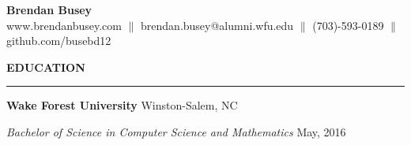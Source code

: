\documentclass[executivepaper]{extarticle}
\begin{document}
\begin{center}

\thispagestyle{empty}

\resizebox{!}{4.3in}
{
\begin{minipage}{7.0in}


\begin{center}

\LARGE\textbf{\fontsize{14}{12}\selectfont Brendan Busey} \\

\fontsize {10}{8}\selectfont {\faDesktop} www.brendanbusey.com $\parallel$ \fontsize{10}{8}\selectfont {\faEnvelope} brendan.busey@alumni.wfu.edu $\parallel$ \fontsize{10}{8}\selectfont {\faPhone} (703)-593-0189 $\parallel$ \fontsize{10}{8}\selectfont {\faGithub} github.com/busebd12

\end{center}


\vspace{-1mm}

{\noindent \textbf{\fontsize{12}{9}\selectfont EDUCATION}}

\vspace{-3mm}

\noindent \rule{\textwidth}{0.5pt}

\vspace{0.5mm}

{\noindent \textbf{\fontsize{11}{8}\selectfont Wake Forest University}} {\hfill \fontsize{10}{7}\selectfont Winston-Salem, NC}

\vspace{0.5mm}

{\noindent \textit{\fontsize{11}{8}\selectfont Bachelor of Science in Computer Science and Mathematics}} {\hfill \fontsize{10}{7}\selectfont May, 2016}

\vspace{-1mm}

\vspace{3mm}



\end{minipage}}
\end{center}
\end{document}
